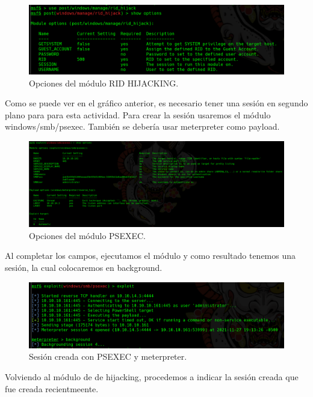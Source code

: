\documentclass{article}
\begin{document}
\begin{figure}[H]
	\center
	\includegraphics[width=\textwidth/2]{images/forest/Post_Msf_latool.png}
	\caption{Opciones del módulo RID HIJACKING.}
\end{figure}

Como se puede ver en el gráfico anterior, es necesario tener una sesión en segundo plano para para esta actividad. Para crear la sesión usaremos el módulo windows/smb/psexec. También se debería usar meterpreter como payload.

\begin{figure}[H]
	\center
	\includegraphics[width=\textwidth/2]{images/forest/creando la sesion.png}
	\caption{Opciones del módulo PSEXEC.}
\end{figure}

Al completar los campos, ejecutamos el módulo y como resultado tenemos una sesión, la cual colocaremos en background.

\begin{figure}[H]
	\center
	\includegraphics[width=\textwidth/2]{images/forest/sesion_creada.png}
	\caption{Sesión creada con PSEXEC y meterpreter.}
\end{figure}

Volviendo al módulo de de hijacking, procedemos a indicar la sesión creada que fue creada recientmeente.
\end{document}
